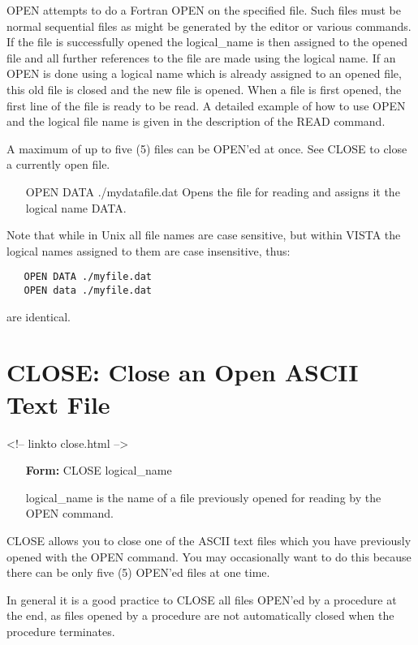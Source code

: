 OPEN attempts to do a Fortran OPEN on the specified file. Such files must
be normal sequential files as might be generated by the editor or various
commands.  If the file is successfully opened the logical\_name is then
assigned to the opened file and all further references to the file are made
using the logical name. If an OPEN is done using a logical name which is
already assigned to an opened file, this old file is closed and the new
file is opened.  When a file is first opened, the first line of the file is
ready to be read.  A detailed example of how to use OPEN and the logical
file name is given in the description of the READ command. 

A maximum of up to five (5) files can be OPEN'ed at once.  See CLOSE to
close a currently open file.

\begin{itemize}
  \item[OPEN DATA ./mydatafile.dat\hfill]{ Opens the file for reading
       and assigns it the logical name DATA.}
\end{itemize}

Note that while in Unix all file names are case sensitive, but within
VISTA the logical names assigned to them are case insensitive, thus:
\begin{verbatim}
   OPEN DATA ./myfile.dat
   OPEN data ./myfile.dat
\end{verbatim}
are identical.

\section{CLOSE: Close an Open ASCII Text File}
\begin{rawhtml}
<!-- linkto close.html -->
\end{rawhtml}
\begin{itemize}
  \item[\textbf{Form: }CLOSE logical\_name\hfill]{}
  \item[logical\_name]{is the name of a file previously
       opened for reading by the OPEN command.}
\end{itemize}

CLOSE allows you to close one of the ASCII text files which you have
previously opened with the OPEN command.  You may occasionally want to do
this because there can be only five (5) OPEN'ed files at one time.  

In general it is a good practice to CLOSE all files OPEN'ed by a procedure
at the end, as files opened by a procedure are not automatically closed
when the procedure terminates.

